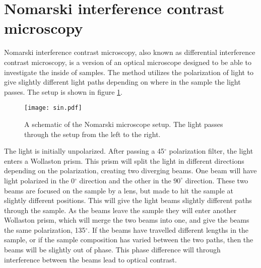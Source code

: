 
	
\section{Nomarski interference contrast microscopy}
\label{sec:nomarski}

Nomarski interference contrast microscopy, also known as differential interference contrast microscopy, is a version of an optical microscope designed to be able to investigate the inside of samples. The method utilizes the polarization of light to give slightly different light paths depending on where in the sample the light passes. The setup is shown in figure \ref{fig:nomarski}.

\begin{figure}[h]
\begin{center}
\texttt{[image: sin.pdf]}
\caption{A schematic of the Nomarski microscope setup. The light passes through the setup from the left to the right. 
\label{fig:nomarski}}
\end{center}
\end{figure}

The light is initially unpolarized. After passing a 45$^\circ$ polarization filter, the light enters a Wollaston prism. This prism will split the light in different directions depending on the polarization, creating two diverging beams. One beam will have light polarized in the 0$^\circ$ direction and the other in the $90^\circ$ direction. These two beams are focused on the sample by a lens, but made to hit the sample at slightly different positions. This will give the light beams slightly different paths through the sample. As the beams leave the sample they will enter another Wollaston prism, which will merge the two beams into one, and give the beams the same polarization, 135$^\circ$. If the beams have travelled different lengths in the sample, or if the sample composition has varied between the two paths, then the beams will be slightly out of phase. This phase difference will through interference between the beams lead to optical contrast.

